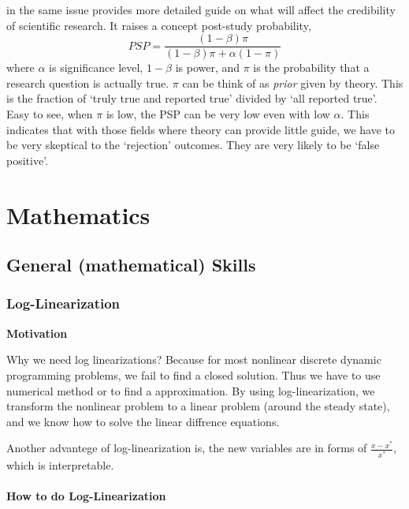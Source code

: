 \documentclass{book}
\theoremstyle{plain}
\theoremstyle{definition}
\begin{document}
\cite{Maniadis:2017hi} in the same issue provides more detailed guide on what will affect the credibility of scientific research.
It raises a concept post-study probability,
\[PSP=\frac{(1-\beta)\pi}{(1-\beta)\pi+ \alpha(1-\pi)}\]
where $\alpha$ is significance level, $1-\beta$ is power,
and $\pi$ is the probability that a research question is actually true. $\pi$ can be think of as \textit{prior} given by theory.
This is the fraction of `truly true and reported true' divided by `all reported true'.
Easy to see, when $\pi$ is low, 
the PSP can be very low even with low $\alpha$.
This indicates that with those fields where theory can provide little guide,
we have to be very skeptical to the `rejection' outcomes.
They are very likely to be `false positive'. 













\part{Mathematics}

\chapter{General (mathematical) Skills} %
\label{cha:general_mathematical_skills}

\section{Log-Linearization}

\noindent
\textbf{Motivation}

Why we need log linearizations?
Because for most nonlinear discrete dynamic programming problems,
we fail to find a closed solution.
Thus we have to use numerical method or to find a approximation.
By using log-linearization,
we transform the nonlinear problem to a linear problem (around the steady state),
and we know how to solve the linear diffrence equations.

Another advantege of log-linearization is,
the new variables are in forms of $\frac{x-x^*}{x^*}$,
which is interpretable.\\


\subsection{How to do Log-Linearization}
\end{document}
